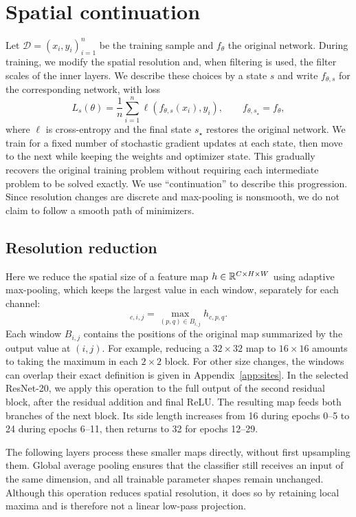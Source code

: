 \section{Spatial continuation}
\label{sec:methods}
Let $\mathcal D={(x_i,y_i)}_{i=1}^n$ be the training sample and $f_\theta$ the original network. During training, we modify the spatial resolution and, when filtering is used, the filter scales of the inner layers. We describe these choices by a state $s$ and write $f_{\theta,s}$ for the corresponding network, with loss
\begin{equation}
L_s(\theta)=\frac1n\sum_{i=1}^n\ell(f_{\theta,s}(x_i),y_i),
\qquad f_{\theta,s_\star}=f_\theta,
\label{eq:family}
\end{equation}
where $\ell$ is cross-entropy and the final state $s_\star$ restores the original network. We train for a fixed number of stochastic gradient updates at each state, then move to the next while keeping the weights and optimizer state. This gradually recovers the original training problem without requiring each intermediate problem to be solved exactly. We use ``continuation'' to describe this progression. Since resolution changes are discrete and max-pooling is nonsmooth, we do not claim to follow a smooth path of minimizers.

\subsection{Resolution reduction}
Here we reduce the spatial size of a feature map $h\in\mathbb R^{C\times H\times W}$ using adaptive max-pooling, which keeps the largest value in each window, separately for each channel:
\begin{equation}
[R_{r_h,r_w}(h)]_{c,i,j}=\max_{(p,q)\in B_{i,j}}h_{c,p,q}.
\label{eq:pool}
\end{equation}
Each window $B_{i,j}$ contains the positions of the original map summarized by the output value at $(i,j)$. For example, reducing a $32\times32$ map to $16\times16$ amounts to taking the maximum in each $2\times2$ block. For other size changes, the windows can overlap their exact definition is given in Appendix~\ref{app:sites}. In the selected ResNet-20, we apply this operation to the full output of the second residual block, after the residual addition and final ReLU. The resulting map feeds both branches of the next block. Its side length increases from 16 during epochs 0--5 to 24 during epochs 6--11, then returns to 32 for epochs 12--29.

The following layers process these smaller maps directly, without first upsampling them. Global average pooling ensures that the classifier still receives an input of the same dimension, and all trainable parameter shapes remain unchanged. Although this operation reduces spatial resolution, it does so by retaining local maxima and is therefore not a linear low-pass projection.


